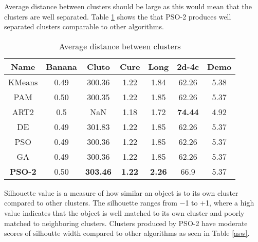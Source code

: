 \documentclass[conference]{IEEEtran}
\begin{document}
Average distance between clusters should be large as this would mean that the clusters are well separated. Table \ref{wcad} shows the that PSO-2 produces well separated clusters comparable to other algorithms.

\begin{table}[H]
\caption{Average distance between clusters}
\label{wcad}
\centering
\begin{tabular}{||c|c|c|c|c|c|c||}
  \hline
\multicolumn{1}{|c|}{\textbf{Name}} & \multicolumn{1}{c|}{\textbf{Banana}} & \multicolumn{1}{c|}{\textbf{Cluto}} & \multicolumn{1}{c|}{\textbf{Cure}} & \multicolumn{1}{c|}{\textbf{Long}} & \multicolumn{1}{c|}{\textbf{2d-4c}} & \multicolumn{1}{c|}{\textbf{Demo}}\\
 \hline\hline
  KMeans & 0.49 & 300.36 & 1.22 & 1.84 & 62.26 & 5.38 \\ [0.5ex]
   \hline
  PAM & 0.50 & 300.35 & 1.22 & 1.85 & 62.26 & 5.37 \\
   \hline
  ART2 & 0.5 & NaN & 1.18 & 1.72 & \textbf{74.44} & 4.92 \\
   \hline
  DE & 0.49 & 301.83 & 1.22 & 1.85 & 62.26 & 5.37 \\
   \hline
  PSO & 0.49 & 300.36 & 1.22 & 1.85 & 62.26 & 5.37 \\
   \hline
  GA & 0.49 & 300.36 & 1.22 & 1.85 & 62.26 & 5.37 \\
   \hline
  \textbf{PSO-2} & 0.50 & \textbf{303.46} & \textbf{1.22} &  \textbf{2.26} & 66.9 & 5.37 \\  [1ex]
  \hline
\end{tabular}
\end{table}

Silhouette value is a measure of how similar an object is to its own cluster compared to other clusters. The silhouette ranges from −1 to +1, where a high value indicates that the object is well matched to its own cluster and poorly matched to neighboring clusters. Clusters produced by PSO-2 have moderate scores of silhoutte width compared to other algorithms as seen in Table \ref{asw}. 
\end{document}
